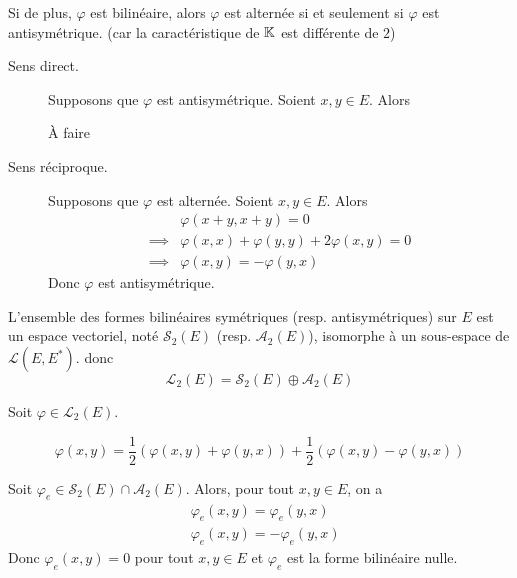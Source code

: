 \documentclass[a4paper, 12pt]{article}
\begin{document}
\begin{proposition}{}{}
    Si de plus, $\varphi$ est bilinéaire, alors $\varphi$ est alternée si et seulement si $\varphi$ est antisymétrique.
    (car la caractéristique de $\mathbb{K}$ est différente de $2$)
\end{proposition}

\begin{demonstration}
    \begin{description}
        \item[Sens direct.]
        Supposons que $\varphi$ est antisymétrique. Soient $x, y \in E$. Alors
        \begin{hotwarn}
            À faire
        \end{hotwarn}

        \item[Sens réciproque.]
        Supposons que $\varphi$ est alternée. Soient $x, y \in E$. Alors
        \begin{align*}
            &\varphi(x + y, x + y) = 0 \\
            \implies &\varphi(x, x) + \varphi(y, y) + 2\varphi(x, y) = 0 \\
            \implies &\varphi(x, y) = -\varphi(y, x)
        \end{align*}
        Donc $\varphi$ est antisymétrique.
    \end{description}
\end{demonstration}

\begin{proposition}{}{}
    L'ensemble des formes bilinéaires symétriques (resp. antisymétriques) sur $E$ est un espace vectoriel, noté $\mathcal{S}_2(E)$ (resp. $\mathcal{A}_2(E)$), isomorphe à un sous-espace de $\mathcal{L}(E, E^*)$.
    donc
    $$
    \mathcal{L}_2(E) = \mathscr{S}_2(E) \oplus \mathscr{A}_2(E)
    $$
\end{proposition}

\begin{demonstration}
    Soit $\varphi \in \mathcal{L}_2(E)$.

    $$
    \varphi(x, y) = \frac{1}{2}(\varphi(x, y) + \varphi(y, x)) + \frac{1}{2}(\varphi(x, y) - \varphi(y, x))
    $$

    Soit $\varphi_e \in \mathscr{S}_2(E) \cap \mathscr{A}_2(E)$. Alors, pour tout $x, y \in E$, on a
    \begin{align*}
        &\varphi_e(x, y) = \varphi_e(y, x) \\
        &\varphi_e(x, y) = -\varphi_e(y, x)
    \end{align*}
    Donc $\varphi_e(x, y) = 0$ pour tout $x, y \in E$ et $\varphi_e$ est la forme bilinéaire nulle.
\end{demonstration}
\end{document}
